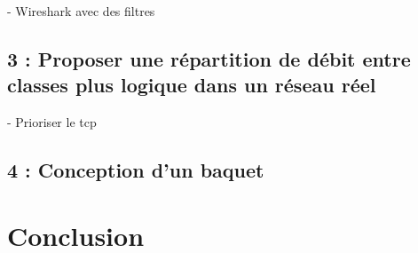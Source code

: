 \documentclass{article}
\begin{document}
- Wireshark avec des filtres

\subsection*{3 : Proposer une répartition de débit entre classes plus logique dans un réseau réel}

- Prioriser le tcp

\subsection*{4 : Conception d'un baquet}




\section{Conclusion}

\printbibliography
\end{document}
